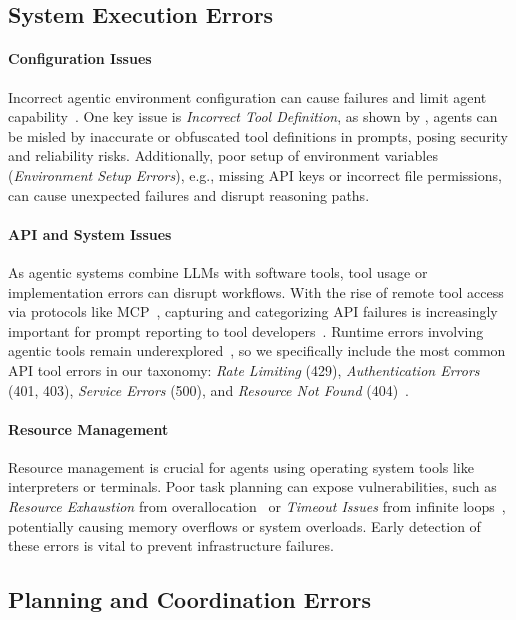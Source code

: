 \documentclass[11pt]{article}
\begin{document}
\subsection{System Execution Errors}

\paragraph{Configuration Issues}
Incorrect agentic environment configuration can cause failures and limit agent capability~\cite{hu2024agentgen}. One key issue is \textit{Incorrect Tool Definition}, as shown by \citet{fu2024imprompter}, agents can be misled by inaccurate or obfuscated tool definitions in prompts, posing security and reliability risks. Additionally, poor setup of environment variables (\textit{Environment Setup Errors}), e.g., missing API keys or incorrect file permissions, can cause unexpected failures and disrupt reasoning paths.

\paragraph{API and System Issues}
As agentic systems combine LLMs with software tools, tool usage or implementation errors can disrupt workflows. With the rise of remote tool access via protocols like MCP~\cite{anthropic2025context}, capturing and categorizing API failures is increasingly important for prompt reporting to tool developers~\cite{shen2024llm}. Runtime errors involving agentic tools remain underexplored~\cite{milev2025toolfuzz}, so we specifically include the most common API tool errors in our taxonomy: \textit{Rate Limiting} (429), \textit{Authentication Errors} (401, 403), \textit{Service Errors} (500), and \textit{Resource Not Found} (404)~\cite{liu2023agentbench}.

\paragraph{Resource Management}
Resource management is crucial for agents using operating system tools like interpreters or terminals. Poor task planning can expose vulnerabilities, such as \textit{Resource Exhaustion} from overallocation~\cite{ge2023llm} or \textit{Timeout Issues} from infinite loops~\cite{zhang2024breaking}, potentially causing memory overflows or system overloads. Early detection of these errors is vital to prevent infrastructure failures.

\subsection{Planning and Coordination Errors}
\end{document}
